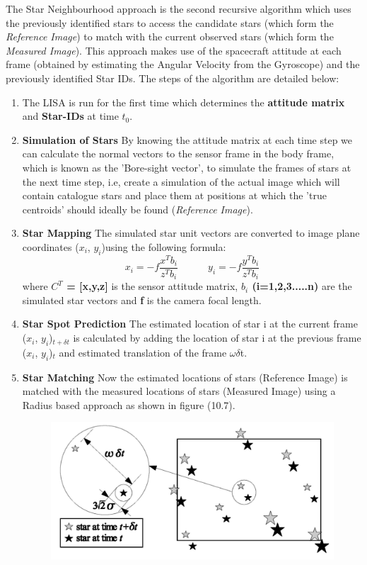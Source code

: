 \documentclass[../../main.tex]{subfiles}
\begin{document}
\begin{itemize}
    The Star Neighbourhood approach is the second recursive algorithm which uses the previously identified stars to access the candidate stars (which form the \textit{Reference Image}) to match with the current observed stars (which form the \textit{Measured Image}). This approach makes use of the spacecraft attitude at each frame (obtained by estimating the Angular Velocity from the Gyroscope) and the previously identified Star IDs. The steps of the algorithm are detailed below:
    \begin{enumerate}
        \item The LISA is run for the first time which determines the \textbf{attitude matrix} and \textbf{Star-IDs} at time $t_{0}$.
        \item \textbf{Simulation of Stars}
        By knowing the attitude matrix at each time step we can calculate the normal vectors to the sensor frame in the body frame, which is known as the 'Bore-sight vector', to simulate the frames of stars at the next time step, i.e, create a simulation of the actual image which will contain catalogue stars and place them at positions at which the 'true centroids' should ideally be found (\textit{Reference Image}).
        \item \textbf{Star Mapping}
        The simulated star unit vectors are converted to image plane coordinates ($x_{i}$, $y_{i}$)using the following formula:
        \begin{equation}
            x_{i} = -f\frac{x^{T}b_{i}}{z^{T}b_{i}} \hspace{3em} y_{i} = -f\frac{y^{T}b_{i}}{z^{T}b_{i}}
        \end{equation}
        where \textbf{$C^{T}$ = [x,y,z]} is the sensor attitude matrix, \textbf{$b_{i}$ (i=1,2,3.....n)} are the simulated star vectors and \textbf{f} is the camera focal length. 
        \item \textbf{Star Spot Prediction}
        The estimated location of star i at the current frame ($x_{i}$, $y_{i}$)$_{t+\delta t}$ is calculated by adding the location of star i at the previous frame ($x_{i}$, $y_{i}$)$_{t}$ and estimated translation of the frame $\omega\delta$t.
        \item \textbf{Star Matching} Now the estimated locations of stars (Reference Image) is matched with the measured locations of stars (Measured Image) using a Radius based approach as shown in figure (10.7). 
        \begin{figure}[!h]
        \centering
        \includegraphics[scale=0.20]{Figures/GNC/radius_matching.png}

\end{figure}
\end{enumerate}
\end{itemize}
\end{document}
